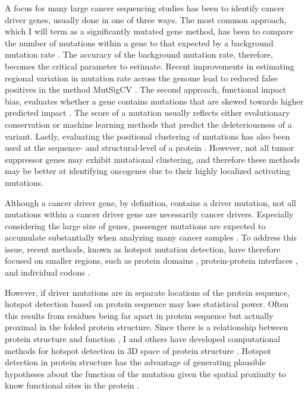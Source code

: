 A focus for many large cancer sequencing studies has been to identify cancer driver genes, usually done in one of three ways. The most common approach, which I will term as a significantly mutated gene method, has been to compare the number of mutations within a gene to that expected by a background mutation rate \cite{RN158, RN156, RN2, RN3}.  The accuracy of the background mutation rate, therefore, becomes the critical parameter to estimate. Recent improvements in estimating regional variation in mutation rate across the genome lead to reduced false positives in the method MutSigCV \cite{RN55, RN29}.  The second approach, functional impact bias, evaluates whether a gene contains mutations that are skewed towards higher predicted impact \cite{RN53}. The score of a mutation usually reflects either evolutionary conservation or machine learning methods that predict the deleteriousness of a variant. Lastly, evaluating the positional clustering of mutations has also been used at the sequence- and structural-level of a protein \cite{RN133, RN16, RN55, RN60, RN62, RN131, RN132, RN155, RN45, RN46, RN110, RN87, RN151, RN152, RN15, RN54}. However, not all tumor suppressor genes may exhibit mutational clustering, and therefore these methods may be better at identifying oncogenes due to their highly localized activating mutations.

Although a cancer driver gene, by definition, contains a driver mutation, not all mutations within a cancer driver gene are necessarily cancer drivers. Especially considering the large size of genes, passenger mutations are expected to accumulate substantially when analyzing many cancer samples \cite{RN56}. To address this issue, recent methods, known as hotspot mutation detection, have therefore focused on smaller regions, such as protein domains \cite{RN54}, protein-protein interfaces \cite{RN53}, and individual codons \cite{RN23}.

However, if driver mutations are in separate locations of the protein sequence, hotspot detection based on protein sequence may lose statistical power. Often this results from residues being far apart in protein sequence but actually proximal in the folded protein structure. Since there is a relationship between protein structure and function \cite{RN112, RN113}, I and others have developed computational methods for hotspot detection in 3D space of protein structure \cite{RN133, RN60, RN131, RN132, RN45, RN105, RN151, RN152, RN15}. Hotspot detection in protein structure has the advantage of generating plausible hypotheses about the function of the mutation given the spatial proximity to know functional sites in the protein \cite{RN57, RN60}.

